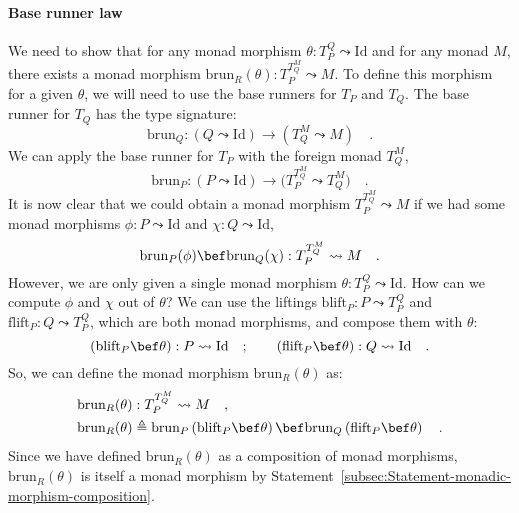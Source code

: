 \paragraph{Base runner law}

We need to show that for any monad morphism $\theta:T_{P}^{Q}\leadsto\text{Id}$
and for any monad $M$, there exists a monad morphism $\text{brun}_{R}(\theta):T_{P}^{T_{Q}^{M}}\leadsto M$.
To define this morphism for a given $\theta$, we will need to use
the base runners for $T_{P}$ and $T_{Q}$. The base runner for $T_{Q}$
has the type signature:
\[
\text{brun}_{Q}:\left(Q\leadsto\text{Id}\right)\rightarrow(T_{Q}^{M}\leadsto M)\quad.
\]
We can apply the base runner for $T_{P}$ with the foreign monad $T_{Q}^{M}$,
\[
\text{brun}_{P}:\left(P\leadsto\text{Id}\right)\rightarrow\big(T_{P}^{T_{Q}^{M}}\leadsto T_{Q}^{M}\big)\quad.
\]
It is now clear that we could obtain a monad morphism $T_{P}^{T_{Q}^{M}}\leadsto M$
if we had some monad morphisms $\phi:P\leadsto\text{Id}$ and $\chi:Q\leadsto\text{Id}$,
\[
\text{brun}_{P}(\phi)\bef\text{brun}_{Q}(\chi):T_{P}^{T_{Q}^{M}}\leadsto M\quad.
\]
However, we are only given a single monad morphism $\theta:T_{P}^{Q}\leadsto\text{Id}$.
How can we compute $\phi$ and $\chi$ out of $\theta$? We can use
the liftings $\text{blift}_{P}:P\leadsto T_{P}^{Q}$ and $\text{flift}_{P}:Q\leadsto T_{P}^{Q}$,
which are both monad morphisms, and compose them with $\theta$:
\[
\left(\text{blift}_{P}\bef\theta\right):P\leadsto\text{Id}\quad;\quad\quad\left(\text{flift}_{P}\bef\theta\right):Q\leadsto\text{Id}\quad.
\]
So, we can define the monad morphism $\text{brun}_{R}(\theta)$ as:
\begin{align*}
\text{brun}_{R}(\theta) & :T_{P}^{T_{Q}^{M}}\leadsto M\quad,\\
\text{brun}_{R}(\theta) & \triangleq\text{brun}_{P}\left(\text{blift}_{P}\bef\theta\right)\bef\text{brun}_{Q}\left(\text{flift}_{P}\bef\theta\right)\quad.
\end{align*}
Since we have defined $\text{brun}_{R}(\theta)$ as a composition
of monad morphisms, $\text{brun}_{R}(\theta)$ is itself a monad morphism
by Statement~\ref{subsec:Statement-monadic-morphism-composition}.

